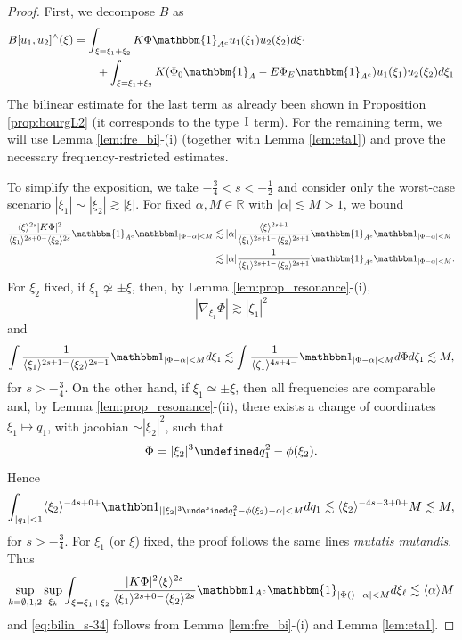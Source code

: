 \documentclass[a4paper,
11pt,  reqno]{amsart}
\makeatletter
\newcommand{\jap}[1]{\langle #1 \rangle}
\newcommand{\I}{\hspace{0.2mm}\textup{I}\hspace{0.2mm}}
\newcommand{\5}{\textup{V}}
\newcommand{\ind}{\mathbbm 1}
\theoremstyle{remark}
\newcommand{\R}{\mathbb{R}}
\let\Re=\undefined\DeclareMathOperator*{\Re}{Re}
\renewcommand{\l}{\ell}
\def\<#1>{\csname MH@symb@#1\endcsname}
\numberwithin{equation}{section}
\numberwithin{theorem}{section}
\makeatother
\begin{document}
\begin{proof}
First, we decompose $B$ as
\begin{align*}
B[u_1,u_2]^\wedge(\xi)&=\int_{\xi=\xi_1+\xi_2} K\Phi\mathbbm{1}_{A^c}u_1(\xi_1)u_2(\xi_2)d\xi_1 \\&\qquad+ \int_{\xi=\xi_1+\xi_2} K(\Phi_0\mathbbm{1}_A -E\Phi_E\mathbbm{1}_{A^c})u_1(\xi_1)u_2(\xi_2)d\xi_1
\end{align*}
The bilinear estimate for the last term as already been shown in Proposition \ref{prop:bourgL2} (it corresponds to the type $\I$ term). For the remaining term, we will use Lemma \ref{lem:fre_bi}-(i) (together with Lemma \ref{lem:eta1}) and prove the necessary frequency-restricted estimates.

To simplify the exposition, we take $-\frac34<s<-\frac12$ and consider only the worst-case scenario $|\xi_1|\sim |\xi_2|\gtrsim |\xi|$. For fixed $\alpha, M\in \R$ with $|\alpha|\lesssim M>1$, we bound
\begin{align}
\frac{\jap{\xi}^{2s}|K\Phi|^2}{\jap{\xi_1}^{2s+0-}\jap{\xi_2}^{2s}}\mathbbm{1}_{A^c}\ind_{|\Phi-\alpha|<M}&\lesssim |\alpha|\frac{\jap{\xi}^{2s+1}}{\jap{\xi_1}^{2s+1-}\jap{\xi_2}^{2s+1}}\mathbbm{1}_{A^c}\ind_{|\Phi-\alpha|<M}\\&\lesssim |\alpha|\frac{1}{\jap{\xi_1}^{2s+1-}\jap{\xi_2}^{2s+1}}\mathbbm{1}_{A^c}\ind_{|\Phi-\alpha|<M}.
\end{align}
For $\xi_2$ fixed, if $\xi_1\not\simeq \pm\xi$, then, by Lemma \ref{lem:prop_resonance}-(i),
$$
|\nabla_{\xi_1}\Phi|\gtrsim |\xi_1|^2
$$
and
\begin{align}
\int \frac{1}{\jap{\xi_1}^{2s+1-}\jap{\xi_2}^{2s+1}}\ind_{|\Phi-\alpha|<M}d\xi_1 \lesssim \int \frac{1}{\jap{\zeta_1}^{4s+4-}}\ind_{|\Phi-\alpha|<M}d\Phi d\zeta_1 \lesssim M,
\end{align}
for $s>-\frac34$. On the other hand, if $\xi_1\simeq \pm \xi$, then all frequencies are comparable and, by Lemma \ref{lem:prop_resonance}-(ii), there exists a change of coordinates $\xi_1\mapsto q_1$, with jacobian $\sim |\xi_2|^2$, such that
$$
\Phi=|\xi_2|^3\Re q_1^2-\phi(\xi_2).
$$
Hence
\begin{align*}
\int_{|q_1|<1} \jap{\xi_2}^{-4s+0+}\ind_{||\xi_2|^3\Re q_1^2-\phi(\xi_2)-\alpha|<M}dq_1 \lesssim \jap{\xi_2}^{-4s-3+0+}M\lesssim M,
\end{align*}
for $s>-\frac34$.
\smallskip
For $\xi_1$ (or $\xi$) fixed, the proof follows the same lines \textit{mutatis mutandis}. Thus
\begin{equation}\label{eq:final_appendix}
\sup_{k=\emptyset, 1, 2}\sup_{\xi_k}\int_{\xi=\xi_1+\xi_2}
        \frac{|K\Phi|^2\jap{\xi}^{2s}}{\jap{\xi_{1}}^{2s+0-}\jap{\xi_{2}}^{2s}}\ind_{A^c}\mathbbm{1}_{|\Phi(\<1>)-\alpha|<M} d\xi_{\l} \lesssim \jap{\alpha}M
    \end{equation}
and \eqref{eq:bilin_s-34} follows from Lemma \ref{lem:fre_bi}-(i) and Lemma \ref{lem:eta1}.
\end{proof}
\end{document}
